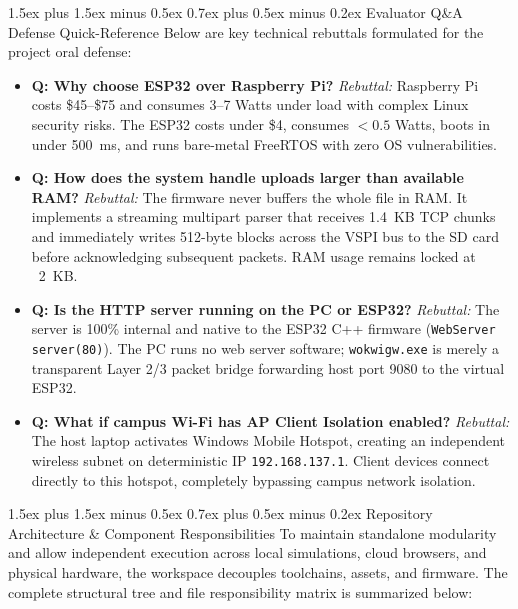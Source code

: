 ﻿\documentclass[conference]{IEEEtran}
\makeatletter
\renewcommand\section{\@startsection{section}{1}{\z@}%
  {1.5ex plus 1.5ex minus 0.5ex}%
  {0.7ex plus 0.5ex minus 0.2ex}%
  {\normalfont\normalsize\bfseries\centering}}
\makeatother
\begin{document}
\section{Evaluator Q\&A Defense Quick-Reference}
Below are key technical rebuttals formulated for the project oral defense:
\begin{itemize}
    \item \textbf{Q: Why choose ESP32 over Raspberry Pi?}  
    \textit{Rebuttal:} Raspberry Pi costs \$45--\$75 and consumes 3--7 Watts under load with complex Linux security risks. The ESP32 costs under \$4, consumes $< 0.5$ Watts, boots in under 500~ms, and runs bare-metal FreeRTOS with zero OS vulnerabilities.
    \item \textbf{Q: How does the system handle uploads larger than available RAM?}  
    \textit{Rebuttal:} The firmware never buffers the whole file in RAM. It implements a streaming multipart parser that receives 1.4~KB TCP chunks and immediately writes 512-byte blocks across the VSPI bus to the SD card before acknowledging subsequent packets. RAM usage remains locked at ~2~KB.
    \item \textbf{Q: Is the HTTP server running on the PC or ESP32?}  
    \textit{Rebuttal:} The server is 100\% internal and native to the ESP32 C++ firmware (\texttt{WebServer server(80)}). The PC runs no web server software; \texttt{wokwigw.exe} is merely a transparent Layer 2/3 packet bridge forwarding host port 9080 to the virtual ESP32.
    \item \textbf{Q: What if campus Wi-Fi has AP Client Isolation enabled?}  
    \textit{Rebuttal:} The host laptop activates Windows Mobile Hotspot, creating an independent wireless subnet on deterministic IP \texttt{192.168.137.1}. Client devices connect directly to this hotspot, completely bypassing campus network isolation.
\end{itemize}

\section{Repository Architecture \& Component Responsibilities}
To maintain standalone modularity and allow independent execution across local simulations, cloud browsers, and physical hardware, the workspace decouples toolchains, assets, and firmware. The complete structural tree and file responsibility matrix is summarized below:
\end{document}
